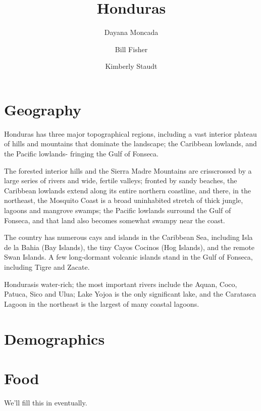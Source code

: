 \documentclass{book}\usepackage[]{graphicx}\usepackage[]{color}
\begin{document}
\title{Honduras}
\author{Dayana Moncada \and Bill Fisher \and Kimberly Staudt}
\date{}
\maketitle

\tableofcontents


\chapter{Geography}

Honduras has three major topographical regions, including a vast interior plateau of hills and mountains that dominate the landscape; the Caribbean lowlands, and the Pacific lowlands- fringing the Gulf of Fonseca. 

\noindent The forested interior hills and the Sierra Madre Mountains are crisscrossed by a large series of rivers and wide, fertile valleys; fronted by sandy beaches, the Caribbean lowlands extend along its entire northern coastline, and there, in the northeast, the Mosquito Coast is a broad uninhabited stretch of thick jungle, lagoons and mangrove swamps; the Pacific lowlands surround the Gulf of Fonseca, and that land also becomes somewhat swampy near the coast. 

\noindent The country has numerous cays and islands in the Caribbean Sea, including Isla de la Bahia (Bay Islands), the tiny Cayos Cocinos (Hog Islands), and the remote Swan Islands. A few long-dormant volcanic islands stand in the Gulf of Fonseca, including Tigre and Zacate. 

\noindent Hondurasis water-rich; the most important rivers include the Aquan, Coco, Patuca, Sico and Ulua; Lake Yojoa is the only significant lake, and the Caratasca Lagoon in the northeast is the largest of many coastal lagoons. 


\chapter{Demographics}


\chapter{Food}


We'll fill this in eventually. 


\printindex
\end{document}
